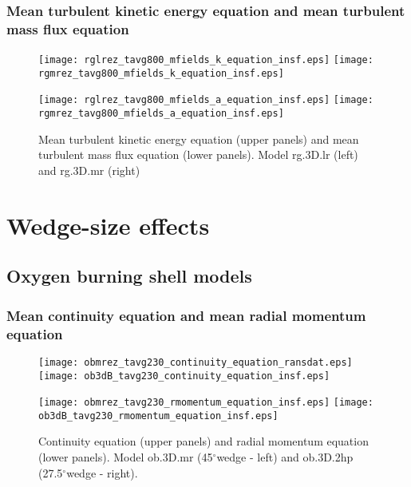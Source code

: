 \documentclass[10pt,paper=a4]{report}
\newcommand{\dgr}{\mbox{$^\circ$}}           %
\begin{document}
\newpage

\subsubsection{Mean turbulent kinetic energy equation and mean turbulent mass flux equation}

\begin{figure}[!h]
\centerline{
\texttt{[image: rglrez\_tavg800\_mfields\_k\_equation\_insf.eps]}
\texttt{[image: rgmrez\_tavg800\_mfields\_k\_equation\_insf.eps]}}

\centerline{
\texttt{[image: rglrez\_tavg800\_mfields\_a\_equation\_insf.eps]}
\texttt{[image: rgmrez\_tavg800\_mfields\_a\_equation\_insf.eps]}}

\caption{Mean turbulent kinetic energy equation (upper panels) and mean turbulent mass flux equation (lower panels). Model {\sf rg.3D.lr} (left) and {\sf rg.3D.mr} (right) \label{fig:rg-res-k-vel-equation}}
\end{figure}

\newpage

\section{Wedge-size effects}

\subsection{Oxygen burning shell models}

\subsubsection{Mean continuity equation and mean radial momentum equation}

\begin{figure}[!h]
\centerline{
\texttt{[image: obmrez\_tavg230\_continuity\_equation\_ransdat.eps]}
\texttt{[image: ob3dB\_tavg230\_continuity\_equation\_insf.eps]}}

\centerline{
\texttt{[image: obmrez\_tavg230\_rmomentum\_equation\_insf.eps]}
\texttt{[image: ob3dB\_tavg230\_rmomentum\_equation\_insf.eps]}}
\caption{Continuity equation (upper panels) and radial momentum equation (lower panels). Model {\sf ob.3D.mr} (45\dgr wedge - left) and {\sf ob.3D.2hp} (27.5\dgr wedge - right). \label{fig:ob-wedge-effects-cont-rmomentum-eq}}
\end{figure}
\end{document}
